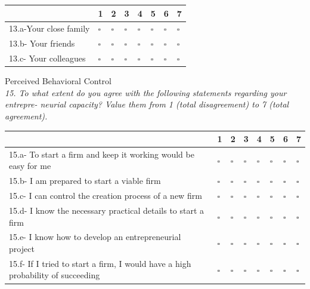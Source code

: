 \begin{table}[H]
\scriptsize	
\centering

\begin{tabular}{p{10cm}lllllll}
\toprule
                                                                             & 1         & 2         & 3         & 4         & 5         & 6         & 7         \\ \midrule
13.a-Your close family & $\square$ & $\square$ & $\square$ & $\square$ & $\square$ & $\square$ & $\square$ \\
13.b- Your friends                          & $\square$ & $\square$ & $\square$ & $\square$ & $\square$ & $\square$ & $\square$ \\
13.c- Your colleagues      & $\square$ & $\square$ & $\square$ & $\square$ & $\square$ & $\square$ & $\square$ \\ \bottomrule
\end{tabular}
\end{table}


\large{Perceived Behavioral Control}
\\
\emph{15. To what extent do you agree with the following statements regarding your entrepre- neurial capacity? Value them from 1 (total disagreement) to 7 (total agreement).}

\begin{table}[H]
\scriptsize	
\centering

\begin{tabular}{p{10cm}lllllll}
\toprule
                                                                               & 1         & 2         & 3         & 4         & 5         & 6         & 7         \\ \midrule
15.a- To start a firm and keep it working would be easy for me                  & $\square$ & $\square$ & $\square$ & $\square$ & $\square$ & $\square$ & $\square$ \\
15.b- I am prepared to start a viable firm                                      & $\square$ & $\square$ & $\square$ & $\square$ & $\square$ & $\square$ & $\square$ \\
15.c- I can control the creation process of a new firm                          & $\square$ & $\square$ & $\square$ & $\square$ & $\square$ & $\square$ & $\square$ \\
15.d- I know the necessary practical details to start a firm                    & $\square$ & $\square$ & $\square$ & $\square$ & $\square$ & $\square$ & $\square$ \\
15.e- I know how to develop an entrepreneurial project                          & $\square$ & $\square$ & $\square$ & $\square$ & $\square$ & $\square$ & $\square$ \\
15.f- If I tried to start a firm, I would have a high probability of succeeding & $\square$ & $\square$ & $\square$ & $\square$ & $\square$ & $\square$ & $\square$ \\ \bottomrule
\end{tabular}
\end{table}


